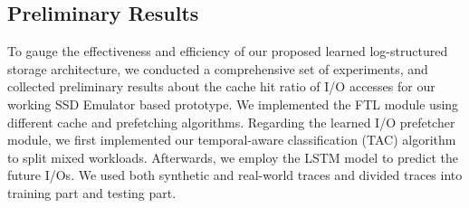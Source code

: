 \subsection*{Preliminary Results}

To gauge the effectiveness and efficiency of our proposed learned log-structured storage architecture,
we conducted a comprehensive set of experiments, and collected preliminary results about the cache hit ratio of I/O accesses
for our working SSD Emulator based prototype.
We implemented the FTL module using different cache and prefetching algorithms.
Regarding the learned I/O prefetcher module,
we first implemented our temporal-aware classification (TAC) algorithm to split mixed workloads.
Afterwards, we employ the LSTM model to predict the future I/Os.
We used both synthetic and real-world traces and divided traces into training part and testing part.


